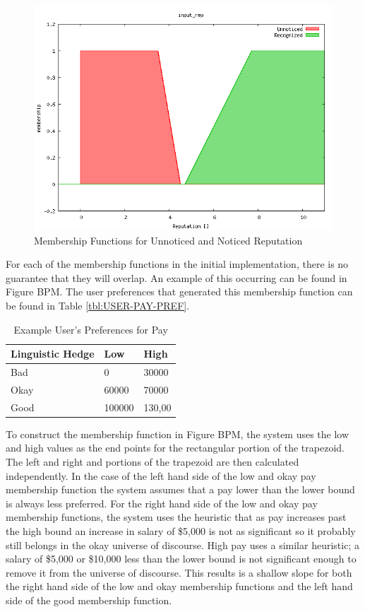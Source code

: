 \documentclass[12pt,fleqn,reqno,letterpaper]{article}
\begin{document}
\begin{figure}[H]
  \centering
  \includegraphics[scale=0.5,natwidth=640,natheight=480]{fig/baseline_input_rep.png}
  \caption{Membership Functions for Unnoticed and Noticed Reputation}
  \label{fig:BRM}
\end{figure}

For each of the membership functions in the initial implementation, there is no guarantee that they will overlap. An example of this occurring can be found in Figure BPM. The user preferences that generated this membership function can be found in Table \ref{tbl:USER-PAY-PREF}.

\begin{table}[H]
  \caption{Example User’s Preferences for Pay}
  \label{tbl:USER-PAY-REF}
  \centering
\begin{tabular}{|l|l|l|}
\hline
\textbf{Linguistic Hedge} & \textbf{Low} & \textbf{High} \\ \hline
Bad                       & 0            & 30000         \\ \hline
Okay                      & 60000        & 70000         \\ \hline
Good                      & 100000       & 130,00        \\ \hline
\end{tabular}
\end{table}
To construct the membership function in Figure BPM, the system uses the low and high values as the end points for the rectangular portion of the trapezoid. The left and right and portions of the trapezoid are then calculated independently. In the case of the left hand side of the low and okay pay membership function the system assumes that a pay lower than the lower bound is always less preferred. For the right hand side of the low and okay pay membership functions, the system uses the heuristic that as pay increases past the high bound an increase in salary of \$5,000 is not as significant so it probably still belongs in the okay universe of discourse. High pay uses a similar heuristic; a salary of \$5,000 or \$10,000 less than the lower bound is not significant enough to remove it from the universe of discourse. This results is a shallow slope for both the right hand side of the low and okay membership functions and the left hand side of the good membership function.
\end{document}
